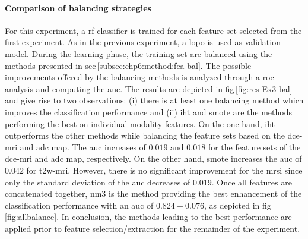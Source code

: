 \paragraph{Comparison of balancing strategies}
For this experiment, a \ac{rf} classifier is trained for each feature set selected from the first experiment.
As in the previous experiment, a \ac{lopo} is used as validation model.
During the learning phase, the training set are balanced using the methods presented in \acs{sec}\,\ref{subsec:chp6:method:fea-bal}.
The possible improvements offered by the balancing methods is analyzed through a \ac{roc} analysis and computing the \ac{auc}.
The results are depicted in \acs{fig}\,\ref{fig:res-Ex3-bal} and give rise to two observations:
(i) there is at least one balancing method which improves the classification performance and
(ii) \ac{iht} and \ac{smote} are the methods performing the best on individual modality features.
On the one hand, \ac{iht} outperforms the other methods while balancing the feature sets based on the \ac{dce}-\ac{mri} and \ac{adc} map.
The \ac{auc} increases of $0.019$ and $0.018$ for the feature sets of the \ac{dce}-\ac{mri} and \ac{adc} map, respectively.
On the other hand, \ac{smote} increases the \ac{auc} of $0.042$ for \ac{t2w}-\ac{mri}.
However, there is no significant improvement for the \ac{mrsi} since only the standard deviation of the \ac{auc} decreases of $0.019$.
Once all features are concatenated together, \ac{nm3} is the method providing the best enhancement of the classification performance with an \ac{auc} of $0.824 \pm 0.076$, as depicted in \acs{fig}\,\ref{fig:allbalance}.
In conclusion, the methods leading to the best performance are applied prior to feature selection/extraction for the remainder of the experiment.

